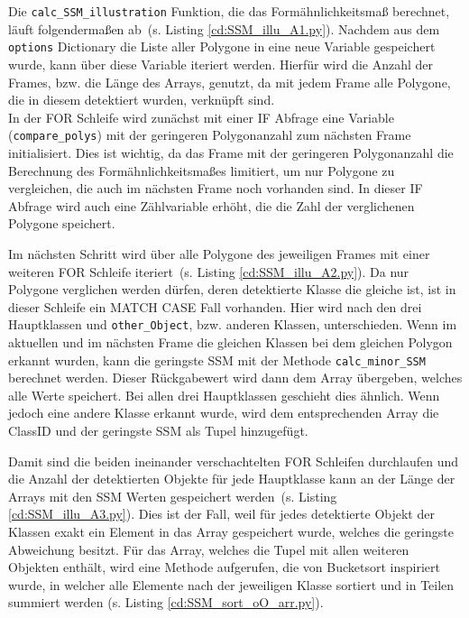{	Die \lstinline|calc_SSM_illustration| Funktion, die das Formähnlichkeitsmaß berechnet, läuft folgendermaßen ab\ifimportant \ (s. Listing \ref{cd:SSM_illu_A1.py})\fi. Nachdem aus dem \lstinline|options| Dictionary die Liste aller Polygone in eine neue Variable gespeichert wurde, kann über diese Variable iteriert werden. Hierfür wird die Anzahl der Frames, bzw. die Länge des Arrays, genutzt, da mit jedem Frame alle Polygone, die in diesem detektiert wurden, verknüpft sind. \\
	In der FOR Schleife wird zunächst mit einer IF Abfrage eine Variable (\lstinline|compare_polys|) mit der geringeren Polygonanzahl zum nächsten Frame initialisiert. Dies ist wichtig, da das Frame mit der geringeren Polygonanzahl die Berechnung des Formähnlichkeitsmaßes limitiert, um nur Polygone zu vergleichen, die auch im nächsten Frame noch vorhanden sind. In dieser IF Abfrage wird auch eine Zählvariable erhöht, die die Zahl der verglichenen Polygone speichert. \\
	\ifimportant
	
	\fi Im nächsten Schritt wird über alle Polygone des jeweiligen Frames mit einer weiteren FOR Schleife iteriert\ifimportant \ (s. Listing \ref{cd:SSM_illu_A2.py})\fi. Da nur Polygone verglichen werden dürfen, deren detektierte Klasse die gleiche ist, ist in dieser Schleife ein MATCH CASE Fall vorhanden. Hier wird nach den drei Hauptklassen und \lstinline|other_Object|, bzw. anderen Klassen, unterschieden. Wenn im aktuellen und im nächsten Frame die gleichen Klassen bei dem gleichen Polygon erkannt wurden, kann die geringste SSM mit der Methode \lstinline|calc_minor_SSM| berechnet werden. Dieser Rückgabewert wird dann dem Array übergeben, welches alle Werte speichert. Bei allen drei Hauptklassen geschieht dies ähnlich. Wenn jedoch eine andere Klasse erkannt wurde, wird dem entsprechenden Array die ClassID und der geringste SSM als Tupel hinzugefügt. \\
	\ifimportant
	
	\fi Damit sind die beiden ineinander verschachtelten FOR Schleifen durchlaufen und die Anzahl der detektierten Objekte für jede Hauptklasse kann an der Länge der Arrays mit den SSM Werten gespeichert werden\ifimportant \ (s. Listing \ref{cd:SSM_illu_A3.py})\fi. Dies ist der Fall, weil für jedes detektierte Objekt der Klassen exakt ein Element in das Array gespeichert wurde, welches die geringste Abweichung besitzt. Für das Array, welches die Tupel mit allen weiteren Objekten enthält, wird eine Methode aufgerufen, die von Bucketsort inspiriert wurde, in welcher alle Elemente nach der jeweiligen Klasse sortiert und in Teilen summiert werden \ifimportant (s. Listing \ref{cd:SSM_sort_oO_arr.py})\fi.  \\
}
